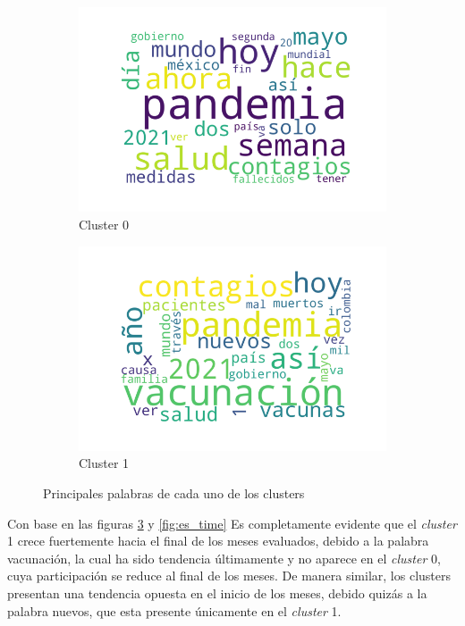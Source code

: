 \begin{figure}
     \centering
     \begin{subfigure}[b]{0.75\textwidth}
         \centering
         \includegraphics[width=\textwidth]{results/TopicDetection/es/cluster0.png}
         \caption{Cluster 0}
         \label{fig:es_c0}
     \end{subfigure}
     \hfill
     \begin{subfigure}[b]{0.75\textwidth}
         \centering
         \includegraphics[width=\textwidth]{results/TopicDetection/es/cluster1.png}
         \caption{Cluster 1}
         \label{fig:es_c1}
     \end{subfigure}
        \caption{Principales palabras de cada uno de los clusters}
        \label{fig:es_clusters}
\end{figure}

Con base en las figuras \ref{fig:es_clusters} y \ref{fig:es_time} Es completamente evidente que el \textit{cluster} 1 crece fuertemente hacia el final de los meses evaluados, debido a la palabra vacunación, la cual ha sido tendencia últimamente y no aparece en el \textit{cluster} 0, cuya participación se reduce al final de los meses. De manera similar, los clusters presentan una tendencia opuesta en el inicio de los meses, debido quizás a la palabra nuevos, que esta presente únicamente en el \textit{cluster} 1.

